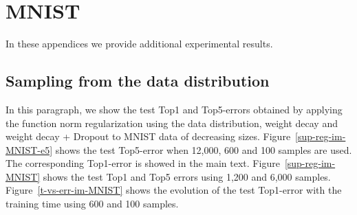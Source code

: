 \documentclass{article}
\begin{document}



\appendix

\section{MNIST}

In these appendices we provide additional experimental results.

\subsection{Sampling from the data distribution}
In this paragraph, we show the test Top1 and Top5-errors obtained by applying the function norm regularization using the data distribution, weight decay and weight decay + Dropout to MNIST data of decreasing sizes. Figure~\ref{sup-reg-im-MNIST-e5} shows the test Top5-error when 12,000, 600 and 100 samples are used. The corresponding Top1-error is showed in the main text. Figure~\ref{sup-reg-im-MNIST} shows the test Top1 and Top5 errors using 1,200 and 6,000 samples. Figure~\ref{t-vs-err-im-MNIST} shows the evolution of the test Top1-error with the training time using 600 and 100 samples.
\end{document}
